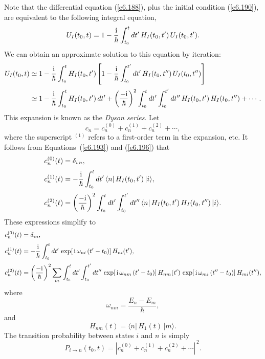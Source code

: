 Note that the differential equation (\ref{e6.188}), plus the initial  condition
(\ref{e6.190}), are equivalent to the following integral equation,
\begin{equation}
U_I(t_0, t) = 1 - \frac{\rm i}{\hbar} \int_{t_0}^t dt' \,H_I(t_0, t')\,
U_I(t_0, t') .
\end{equation}
We can obtain an approximate solution to this equation by iteration:
\begin{align}
U_I(t_0, t) &\simeq 1 - \frac{\rm i}{\hbar} \int_{t_0}^t H_I(t_0, t')
\left[ 1 - \frac{\rm i}{\hbar} \int_{t_0}^{t'} dt'\,H_I(t_0, t'')\,
U_I(t_0, t'')\right] \nonumber \\[0.5ex]
&\simeq 1 - \frac{\rm i}{\hbar} \int_{t_0}^t H_I(t_0, t')\,dt' + \left(\frac{-{\rm i}}{\hbar}\right)^2 \int_{t_0}^t dt'
\int_{t_0}^{t'} dt''\,  H_I(t_0, t' )\,H_I(t_0, t'' ) + \cdots.\label{e6.196}
\end{align}
This expansion is known as the {\em Dyson series}.
Let 
\begin{equation}
c_n = c_n^{(0)} + c_n^{(1)} + c_n^{(2)} + \cdots,
\end{equation}
where the superscript $^{(1)}$ refers to a first-order term in the expansion,
{\rm etc}. It follows from Equations~(\ref{e6.193}) and (\ref{e6.196}) that 
\begin{align}
c_n^{(0)}(t) &= \delta_{i\,n},\\[0.5ex]
c_n^{(1)}(t) &= -\frac{\rm i}{\hbar} \int_{t_0}^t 
dt'\,\langle n |\,H_I(t_0, t')\,|i\rangle,\\[0.5ex]
c_n^{(2)}(t) &= \left(\frac{-{\rm i}}{\hbar}\right)^2 \int_{t_0}^t dt'
\int_{t_0}^{t'}dt''\, \langle n|\,  H_I(t_0, t' )\,H_I(t_0, t'' )\,|i\rangle.
\end{align}
These expressions simplify to
\begin{align}\label{e6.201}
c_n^{(0)}(t) &= \delta_{in},\\[0.5ex]\label{e6.202}
c_n^{(1)}(t) &= -\frac{\rm i}{\hbar} \int_{t_0}^t dt'\, \exp[\,{\rm i} \,\omega_{ni}\,
(t'-t_0)]\, H_{ni}(t') , \\[0.5ex]
c_n^{(2)}(t) &= \left(\frac{-{\rm i}}{\hbar}\right)^2
\sum_m \int_{t_0}^t dt'\int_{t_0}^{t' }dt''\,\exp[\,{\rm i}
 \,\omega_{nm}\,(t'-t_0)]\,  H_{nm}(t') \,
\exp[\,{\rm i} \,\omega_{mi}\,(t''-t_0)]\,H_{mi}(t''),\label{e6.203}
\end{align}
where
\begin{equation}
\omega_{nm} = \frac{E_n -E_m}{\hbar},
\end{equation}
and
\begin{equation}
H_{nm} (t) = \langle n|\, H_1(t)\, | m\rangle.
\end{equation}
The transition probability between states $i$ and $n$ is
simply
\begin{equation}
P_{i\rightarrow n} (t_0, t) = |c_n^{(0)} + c_n^{(1)} + c_n^{(2)} +\cdots|^{\,2}.
\end{equation}

